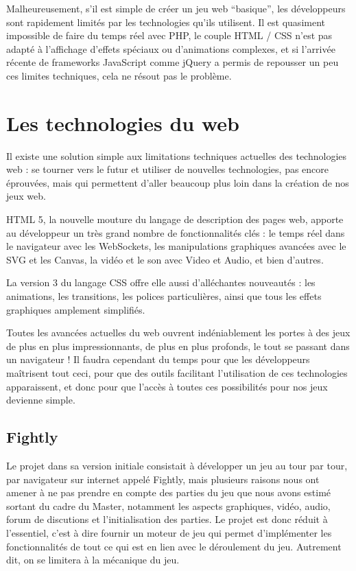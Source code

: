 \documentclass[a4paper,10pt]{report}
\begin{document}
    Malheureusement, s’il est simple de créer un jeu web “basique”, les développeurs sont rapidement limités par les technologies qu’ils utilisent. Il est quasiment impossible de faire du temps réel avec PHP, le couple HTML / CSS n’est pas adapté à l’affichage d’effets spéciaux ou d’animations complexes, et si l’arrivée récente de frameworks JavaScript comme jQuery a permis de repousser un peu ces limites techniques, cela ne résout pas le problème.

  \section{Les technologies du web}

    Il existe une solution simple aux limitations techniques actuelles des technologies web : se tourner vers le futur et utiliser de nouvelles technologies, pas encore éprouvées, mais qui permettent d’aller beaucoup plus loin dans la création de nos jeux web.

    HTML 5, la nouvelle mouture du langage de description des pages web, apporte au développeur un très grand nombre de fonctionnalités clés : le temps réel dans le navigateur avec les WebSockets, les manipulations graphiques avancées avec le SVG et les Canvas, la vidéo et le son avec Video et Audio, et bien d’autres.

    La version 3 du langage CSS offre elle aussi d’alléchantes nouveautés : les animations, les transitions, les polices particulières, ainsi que tous les effets graphiques amplement simplifiés.

    Toutes les avancées actuelles du web ouvrent indéniablement les portes à des jeux de plus en plus impressionnants, de plus en plus profonds, le tout se passant dans un navigateur ! Il faudra cependant du temps pour que les développeurs maîtrisent tout ceci, pour que des outils facilitant l’utilisation de ces technologies apparaissent, et donc pour que l’accès à toutes ces possibilités pour nos jeux devienne simple.

  \subsection{Fightly}

    Le projet dans sa version initiale consistait à développer un jeu au tour par tour, par navigateur sur internet appelé Fightly, mais plusieurs raisons nous ont amener à ne pas prendre en compte des parties du jeu que nous avons estimé sortant du cadre du Master, notamment les aspects graphiques, vidéo, audio, forum de discutions et l'initialisation des parties. Le projet est donc réduit à l'essentiel, c'est à dire fournir un moteur de jeu qui permet d'implémenter les fonctionnalités de tout ce qui est en lien avec le déroulement du jeu. Autrement dit, on se limitera à la mécanique du jeu.
\end{document}
